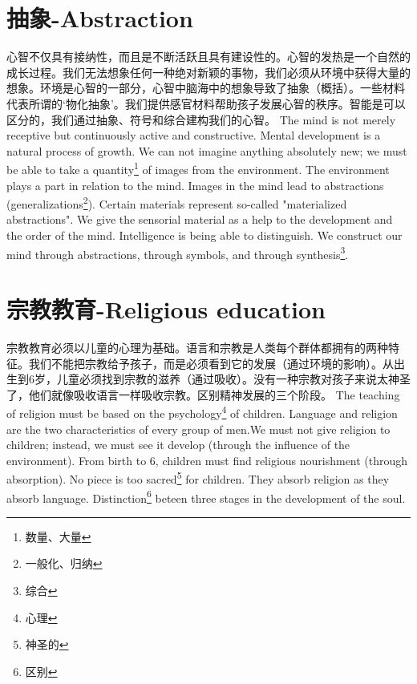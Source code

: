 \documentclass[lang=cn,10pt]{elegantbook}
\begin{document}
\chapter{抽象-Abstraction}

\begin{tcolorbox}[title=摘要,
colback=red!5!white,
colframe=red!75!black,
fonttitle=\bfseries]
心智不仅具有接纳性，而且是不断活跃且具有建设性的。心智的发热是一个自然的成长过程。我们无法想象任何一种绝对新颖的事物，我们必须从环境中获得大量的想象。环境是心智的一部分，心智中脑海中的想象导致了抽象（概括）。一些材料代表所谓的‘物化抽象’。我们提供感官材料帮助孩子发展心智的秩序。智能是可以区分的，我们通过抽象、符号和综合建构我们的心智。
The mind is not merely receptive but continuously active and constructive. Mental development is a natural process of growth. We can not imagine anything absolutely new; we must be able to take a quantity\footnote{数量、大量} of images from the environment. The environment plays a part in relation to the mind. Images in the mind lead to abstractions (generalizations\footnote{一般化、归纳}). Certain materials represent so-called "materialized abstractions". We give the sensorial material as a help to the development and the order of the mind. Intelligence is being able to distinguish. We construct our mind through abstractions, through symbols, and through synthesis\footnote{综合}.
\end{tcolorbox}

\chapter{宗教教育-Religious education}

\begin{tcolorbox}[title=摘要,
colback=red!5!white,
colframe=red!75!black,
fonttitle=\bfseries]
宗教教育必须以儿童的心理为基础。语言和宗教是人类每个群体都拥有的两种特征。我们不能把宗教给予孩子，而是必须看到它的发展（通过环境的影响）。从出生到6岁，儿童必须找到宗教的滋养（通过吸收）。没有一种宗教对孩子来说太神圣了，他们就像吸收语言一样吸收宗教。区别精神发展的三个阶段。
The teaching of religion must be based on the psychology\footnote{心理} of children. Language and religion are the two characteristics of every group of men.We must not give religion to children; instead, we must see it develop (through the influence of the environment). From birth to 6, children must find religious nourishment (through absorption). No piece is too sacred\footnote{神圣的} for children. They absorb religion as they absorb language. Distinction\footnote{区别} beteen three stages in the development of the soul.
\end{tcolorbox}
\end{document}
